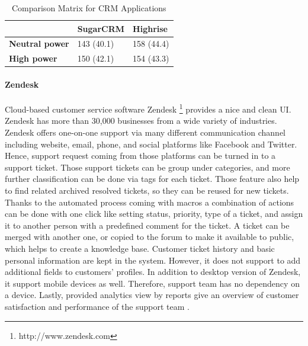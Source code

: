 \begin{table}[!ht]
\begin{center}
	\caption[Comparison Matrix for CRM Applications]{Comparison Matrix for CRM Applications} \label{tab:comp_matr_crm}
    \begin{tabular}{ p{3cm} p{3cm}  p{3cm} }
	\hline
	& \textbf{SugarCRM} & \textbf{Highrise} \\ \hline
	\textbf{Neutral power} & 143 (40.1) & 158 (44.4) \\
	\textbf{High power} & 150 (42.1) & 154 (43.3) \\ \hline
    \end{tabular}
\end{center}
\end{table}

\paragraph{Zendesk}
Cloud-based customer service software Zendesk \footnote{http://www.zendesk.com} provides a nice and clean \ac{UI}. Zendesk has more than 30,000 businesses from a wide variety of industries. Zendesk offers one-on-one support via many different communication channel including website, email, phone, and social platforms like Facebook and Twitter. Hence, support request coming from those platforms can be turned in to a support ticket. Those support tickets can be group under categories, and more further classification can be done via tags for each ticket. Those feature also help to find related archived resolved tickets, so they can be reused for new tickets. Thanks to the automated process coming with macros a combination of actions can be done with one click like setting status, priority, type of a ticket, and assign it to another person with a predefined comment for the ticket. A ticket can be merged with another one, or copied to the forum to make it available to public, which helps to create a knowledge base. Customer ticket history and basic personal information are kept in the system. However, it does not support to add additional fields to customers' profiles. In addition to desktop version of Zendesk, it support mobile devices as well. Therefore, support team has no dependency on a device. Lastly, provided analytics view by reports give an overview of customer satisfaction and performance of the support team \citep{Zendesk2013,Zendesk2013a}.

